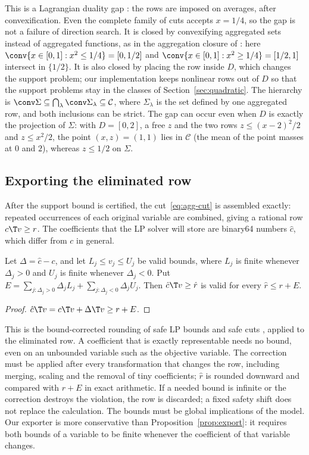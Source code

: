 This is a Lagrangian duality gap \citep{Geoffrion1974,Nowak2005}: the
rows are imposed on averages, after convexification. Even the complete
family of cuts accepts $x=1/4$, so the gap is not a failure of direction
search. It is closed by convexifying aggregated sets instead of aggregated
functions, as in the aggregation closure of
\citet{DeyMunozSerrano2022}: here $\conv\{x\in[0,1]:x^2\le1/4\}=[0,1/2]$ and
$\conv\{x\in[0,1]:x^2\ge1/4\}=[1/2,1]$ intersect in $\{1/2\}$. It is also
closed by placing the row inside $D$, which changes the support problem;
our implementation keeps nonlinear rows out of $D$ so that the support
problems stay in the classes of Section~\ref{sec:quadratic}. The hierarchy
is $\conv\Sigma\subseteq\bigcap_\lambda\conv\Sigma_\lambda\subseteq\mathcal C$, where
$\Sigma_\lambda$ is the set defined by one aggregated row, and both
inclusions can be strict. The gap can occur even when $D$ is exactly the
projection of $\Sigma$: with $D=[0,2]$, a free $z$ and the two rows
$z\le(x-2)^2/2$ and $z\le x^2/2$, the point $(x,z)=(1,1)$ lies in $\mathcal C$ (the
mean of the point masses at $0$ and $2$), whereas $z\le1/2$ on $\Sigma$.

\subsection{Exporting the eliminated row}\label{sec:export}

After the support bound is certified, the cut~\eqref{eq:agg-cut} is
assembled exactly: repeated occurrences of each original variable are
combined, giving a rational row $c\T v\ge r$. The coefficients that the
LP solver will store are binary64 numbers $\hat c$, which differ from $c$
in general.

\begin{proposition}\label{prop:export}
Let $\Delta=\hat c-c$, and let $L_j\le v_j\le U_j$ be valid bounds, where
$L_j$ is finite whenever $\Delta_j>0$ and $U_j$ is finite whenever
$\Delta_j<0$. Put $E=\sum_{j:\Delta_j>0}\Delta_jL_j+\sum_{j:\Delta_j<0}\Delta_jU_j$.
Then $\hat c\T v\ge\hat r$ is valid for every $\hat r\le r+E$.
\end{proposition}

\begin{proof}
$\hat c\T v=c\T v+\Delta\T v\ge r+E$.
\end{proof}

This is the bound-corrected rounding of safe LP bounds and safe cuts
\citep{NeumaierShcherbina2004,CookEtAl2009SafeCuts,EiflerGleixner2024},
applied to the eliminated row. A coefficient that is exactly representable
needs no bound, even on an unbounded variable such as the objective
variable. The correction must be applied after every transformation that
changes the row, including merging, scaling and the removal of tiny
coefficients; $\hat r$ is rounded downward and compared with $r+E$ in exact
arithmetic. If a needed bound is infinite or the correction destroys the
violation, the row is discarded; a fixed safety shift does not replace
the calculation. The bounds must be global implications of the model.
Our exporter is more conservative than Proposition~\ref{prop:export}: it
requires both bounds of a variable to be finite whenever the coefficient
of that variable changes.
